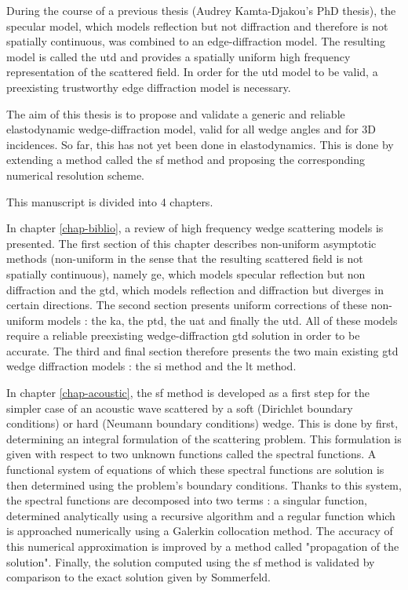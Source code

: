 During the course of a previous thesis (Audrey Kamta-Djakou's PhD thesis), the specular model, which models reflection but not diffraction and therefore is not spatially continuous, was combined to an edge-diffraction model. The resulting model is called the \acrfull{utd} and provides a spatially uniform high frequency representation of the scattered field. In order for the \acrshort{utd} model to be valid, a preexisting trustworthy edge diffraction model is necessary.

The aim of this thesis is to propose and validate a generic and reliable elastodynamic wedge-diffraction model, valid for all wedge angles and for 3D incidences. So far, this has not yet been done in elastodynamics. This is done by extending a method called the \acrfull{sf} method and proposing the corresponding numerical resolution scheme. 

This manuscript is divided into 4 chapters.

In chapter \ref{chap-biblio}, a review of high frequency wedge scattering models is presented. The first section of this chapter describes non-uniform asymptotic methods (non-uniform in the sense that the resulting scattered field is not spatially continuous), namely \acrfull{ge}, which models specular reflection but non diffraction and the \acrfull{gtd}, which models reflection and diffraction but diverges in certain directions. The second section presents uniform corrections of these non-uniform models : the \acrfull{ka}, the \acrfull{ptd}, the \acrfull{uat} and finally the \acrfull{utd}. All of these models require a reliable preexisting wedge-diffraction \acrshort{gtd} solution in order to be accurate. The third and final section therefore presents the two main existing \acrshort{gtd} wedge diffraction models : the \acrfull{si} method and the \acrfull{lt} method.

In chapter \ref{chap-acoustic}, the \acrfull{sf} method is developed as a first step for the simpler case of an acoustic wave scattered by a soft (Dirichlet boundary conditions) or hard (Neumann boundary conditions) wedge. This is done by first, determining an integral formulation of the scattering problem. This formulation is given with respect to two unknown functions called the spectral functions. A functional system of equations of which these spectral functions are solution is then determined using the problem's boundary conditions. Thanks to this system, the spectral functions are decomposed into two terms : a singular function, determined analytically using a recursive algorithm and a regular function which is approached numerically using a Galerkin collocation method. The accuracy of this numerical approximation is improved by a method called "propagation of the solution". Finally, the solution computed using the \acrlong{sf} method is validated by comparison to the exact solution given by Sommerfeld.

